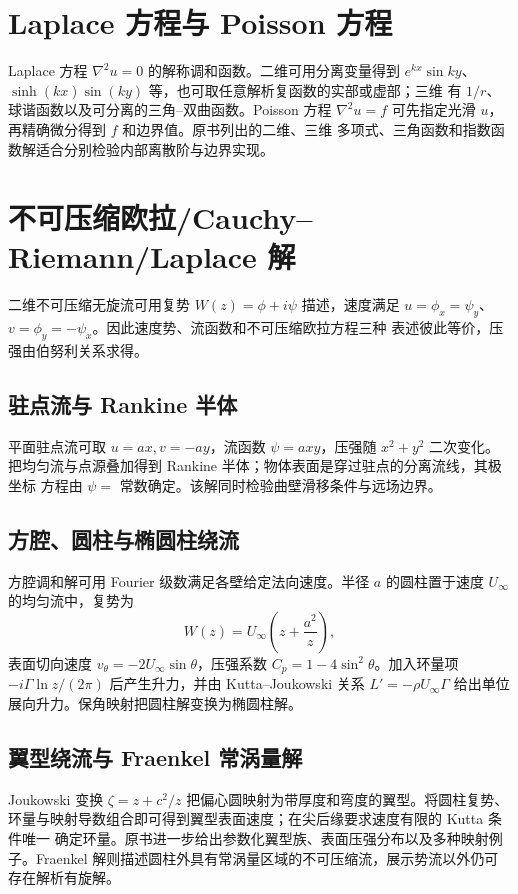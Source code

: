 \documentclass[11pt,a4paper,openany,fontset=none]{ctexbook}
\begin{document}
\section{Laplace 方程与 Poisson 方程}
Laplace 方程 $\nabla^2u=0$ 的解称调和函数。二维可用分离变量得到
$e^{kx}\sin ky$、$\sinh(kx)\sin(ky)$ 等，也可取任意解析复函数的实部或虚部；三维
有 $1/r$、球谐函数以及可分离的三角--双曲函数。Poisson 方程
$\nabla^2u=f$ 可先指定光滑 $u$，再精确微分得到 $f$ 和边界值。原书列出的二维、三维
多项式、三角函数和指数函数解适合分别检验内部离散阶与边界实现。

\section{不可压缩欧拉/Cauchy--Riemann/Laplace 解}
二维不可压缩无旋流可用复势 $W(z)=\phi+i\psi$ 描述，速度满足
$u=\phi_x=\psi_y$、$v=\phi_y=-\psi_x$。因此速度势、流函数和不可压缩欧拉方程三种
表述彼此等价，压强由伯努利关系求得。

\subsection{驻点流与 Rankine 半体}
平面驻点流可取 $u=ax,v=-ay$，流函数 $\psi=axy$，压强随 $x^2+y^2$ 二次变化。
把均匀流与点源叠加得到 Rankine 半体；物体表面是穿过驻点的分离流线，其极坐标
方程由 $\psi=$ 常数确定。该解同时检验曲壁滑移条件与远场边界。

\subsection{方腔、圆柱与椭圆柱绕流}
方腔调和解可用 Fourier 级数满足各壁给定法向速度。半径 $a$ 的圆柱置于速度
$U_\infty$ 的均匀流中，复势为
\begin{equation}W(z)=U_\infty\left(z+\frac{a^2}{z}\right),\end{equation}
表面切向速度 $v_\theta=-2U_\infty\sin\theta$，压强系数
$C_p=1-4\sin^2\theta$。加入环量项
$-i\Gamma\ln z/(2\pi)$ 后产生升力，并由 Kutta--Joukowski 关系
$L'=-\rho U_\infty\Gamma$ 给出单位展向升力。保角映射把圆柱解变换为椭圆柱解。

\subsection{翼型绕流与 Fraenkel 常涡量解}
Joukowski 变换 $\zeta=z+c^2/z$ 把偏心圆映射为带厚度和弯度的翼型。将圆柱复势、
环量与映射导数组合即可得到翼型表面速度；在尖后缘要求速度有限的 Kutta 条件唯一
确定环量。原书进一步给出参数化翼型族、表面压强分布以及多种映射例子。Fraenkel
解则描述圆柱外具有常涡量区域的不可压缩流，展示势流以外仍可存在解析有旋解。
\end{document}
